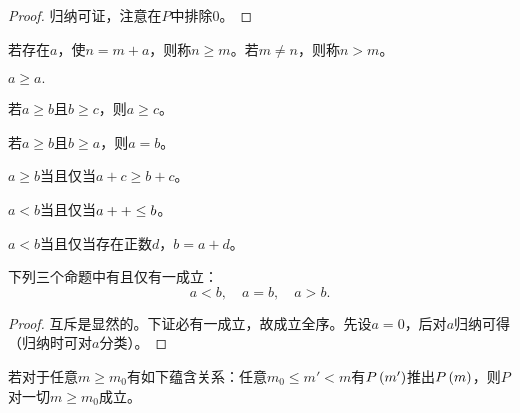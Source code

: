 \documentclass{ctexrep}
\begin{document}
  \begin{proof}
    归纳可证，注意在$P$中排除$0$。
  \end{proof}
  \begin{definition}[自然数的序]
    若存在$a$，使$n=m+a$，则称$n\ge m$。若$m\ne n$，则称$n>m$。
  \end{definition}
  \begin{proposition}
    \begin{aenum}
      \item $a\ge a.$
      \item 若$a\ge b$且$b \ge c$，则$a \ge c$。
      \item 若$a \ge b$且$b \ge a$，则$a=b$。
      \item $a\ge b$当且仅当$a+c \ge b+c$。
      \item $a < b$当且仅当$a++ \le b$。
      \item $a < b$当且仅当存在正数$d$，$b=a+d$。
    \end{aenum}
  \end{proposition}
  \begin{proposition}
    下列三个命题中有且仅有一成立：
    \[ a<b, \quad a=b,\quad a>b. \]
  \end{proposition}
  \begin{proof}
    互斥是显然的。下证必有一成立，故成立全序。先设$a=0$，后对$a$归纳可得（归纳时可对$a$分类）。
  \end{proof}
  \begin{proposition}[强归纳原理]
    若对于任意$m\ge m_0$有如下蕴含关系：任意$m_0\le m' <m$有$P\left(m'\right)$推出$P\left(m\right)$，则$P$对一切$m \ge m_0$成立。
  \end{proposition}
\end{document}
